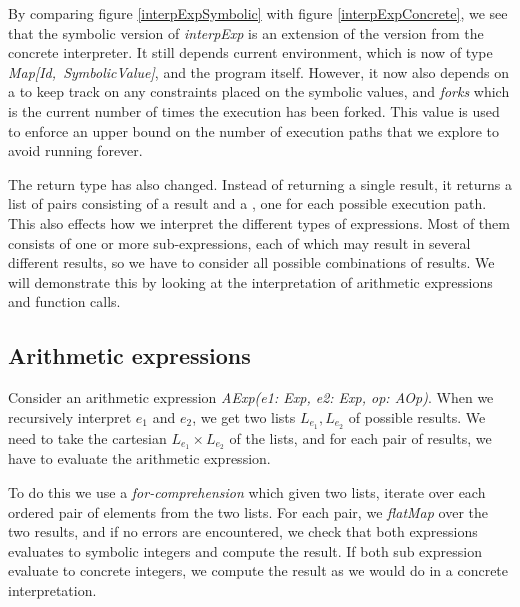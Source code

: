 By comparing figure \ref{interpExpSymbolic} with figure \ref{interpExpConcrete}, we see that the symbolic version of \textsl{interpExp} is an extension of the version from the concrete interpreter. It still depends current environment, which is now of type \mbox{\textsl{Map[Id, SymbolicValue]}}, and the program itself. However, it now also depends on a \pc to keep track on any constraints placed on the symbolic values,
and \textsl{forks} which is the current number of times the execution has been forked. This value is used to enforce an upper bound on the number of execution paths that we explore to avoid running forever.

The return type has also changed. Instead of returning a single result, it returns a list of pairs consisting of a result and a \pc, one for each possible execution path. This also effects how we interpret the different types of expressions. Most of them consists of one or more sub-expressions, each of which may result in several different results, so we have to consider all possible combinations of results. We will demonstrate this by looking at the interpretation of arithmetic expressions and function calls. 

\subsection{Arithmetic expressions}
Consider an arithmetic expression 
\textsl{AExp(e1: Exp, e2: Exp, op: AOp)}. When we recursively interpret $e_1$ and $e_2$, we get two lists $L_{e_1}, L_{e_2}$ of possible results. We need to take the cartesian $L_{e_1} \times L_{e_2}$ of the lists, and for each pair of results, we have to evaluate the arithmetic expression. 

To do this we use a \textsl{for-comprehension} which given two lists, iterate over each ordered pair of elements from the two lists.  For each pair, we \textsl{flatMap} over the two results, and if no errors are encountered, we check that both expressions evaluates to symbolic integers and compute the result. If both sub expression evaluate to concrete integers, we compute the result as we would do in a concrete interpretation. 

